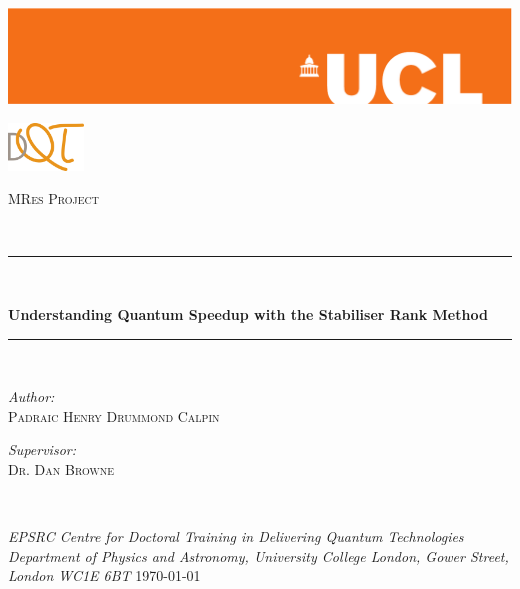 \newcommand{\HRule}{\rule{\linewidth}{0.5mm}}
\begin{titlepage}
\begin{center}
\includegraphics[width=\hsize]{Figures/orange-eps-converted-to}
\\[3cm]
\end{center}

\begin{minipage}{\textwidth}
\begin{flushright}
	\includegraphics[width=0.15\textwidth]{Figures/DQT-LOGO.png}
\end{flushright}
\textsc{\large MRes Project}
\end{minipage}~
\\[1cm]
\HRule \\[0.5cm]
\begin{center}
	\textsf{\huge \bfseries Understanding Quantum Speedup with the Stabiliser Rank Method} \\
\end{center}
\HRule \\[1cm]
\begin{minipage}{0.5\textwidth}
	\begin{flushleft}
		\emph{Author:} \\
		\textsc{Padraic Henry Drummond Calpin} \\[0.4cm]	
	\end{flushleft}
\end{minipage}
\begin{minipage}{0.5\textwidth}
	\begin{flushright}
		\emph{Supervisor:} \\
		\textsc{Dr. Dan Browne} \\[0.4cm]
	\end{flushright}
\end{minipage} \\[3cm]
\begin{center}
	\emph{EPSRC Centre for Doctoral Training in Delivering Quantum Technologies\\ Department of Physics and Astronomy, University College London, Gower Street, London WC1E 6BT}
\vfill
\large \today
\end{center}
\end{titlepage}